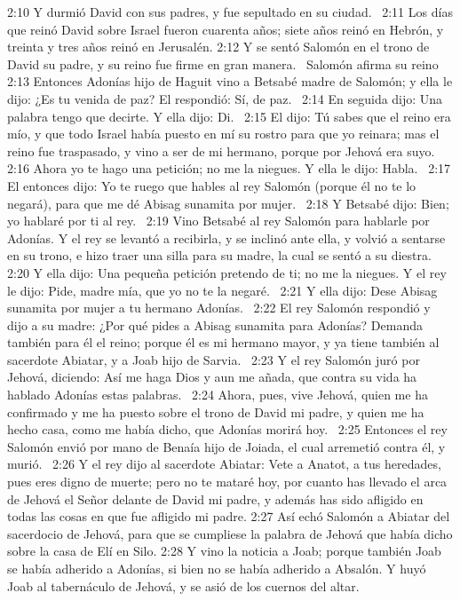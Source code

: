 2:10 Y durmió David con sus padres, y fue sepultado en su ciudad.  
2:11 Los días que reinó David sobre Israel fueron cuarenta años; siete años reinó en Hebrón, y treinta y tres años reinó en Jerusalén. 
2:12 Y se sentó Salomón en el trono de David su padre, y su reino fue firme en gran manera.  
Salomón afirma su reino  
2:13 Entonces Adonías hijo de Haguit vino a Betsabé madre de Salomón; y ella le dijo: ¿Es tu venida de paz? El respondió: Sí, de paz.  
2:14 En seguida dijo: Una palabra tengo que decirte. Y ella dijo: Di.  
2:15 El dijo: Tú sabes que el reino era mío, y que todo Israel había puesto en mí su rostro para que yo reinara; mas el reino fue traspasado, y vino a ser de mi hermano, porque por Jehová era suyo.  
2:16 Ahora yo te hago una petición; no me la niegues. Y ella le dijo: Habla.  
2:17 El entonces dijo: Yo te ruego que hables al rey Salomón (porque él no te lo negará), para que me dé Abisag sunamita por mujer.  
2:18 Y Betsabé dijo: Bien; yo hablaré por ti al rey.  
2:19 Vino Betsabé al rey Salomón para hablarle por Adonías. Y el rey se levantó a recibirla, y se inclinó ante ella, y volvió a sentarse en su trono, e hizo traer una silla para su madre, la cual se sentó a su diestra.  
2:20 Y ella dijo: Una pequeña petición pretendo de ti; no me la niegues. Y el rey le dijo: Pide, madre mía, que yo no te la negaré.  
2:21 Y ella dijo: Dese Abisag sunamita por mujer a tu hermano Adonías.  
2:22 El rey Salomón respondió y dijo a su madre: ¿Por qué pides a Abisag sunamita para Adonías? Demanda también para él el reino; porque él es mi hermano mayor, y ya tiene también al sacerdote Abiatar, y a Joab hijo de Sarvia.  
2:23 Y el rey Salomón juró por Jehová, diciendo: Así me haga Dios y aun me añada, que contra su vida ha hablado Adonías estas palabras.  
2:24 Ahora, pues, vive Jehová, quien me ha confirmado y me ha puesto sobre el trono de David mi padre, y quien me ha hecho casa, como me había dicho, que Adonías morirá hoy.  
2:25 Entonces el rey Salomón envió por mano de Benaía hijo de Joiada, el cual arremetió contra él, y murió.  
2:26 Y el rey dijo al sacerdote Abiatar: Vete a Anatot, a tus heredades, pues eres digno de muerte; pero no te mataré hoy, por cuanto has llevado el arca de Jehová el Señor delante de David mi padre, y además has sido afligido en todas las cosas en que fue afligido mi padre. 
2:27 Así echó Salomón a Abiatar del sacerdocio de Jehová, para que se cumpliese la palabra de Jehová que había dicho sobre la casa de Elí en Silo. 
2:28 Y vino la noticia a Joab; porque también Joab se había adherido a Adonías, si bien no se había adherido a Absalón. Y huyó Joab al tabernáculo de Jehová, y se asió de los cuernos del altar.  
